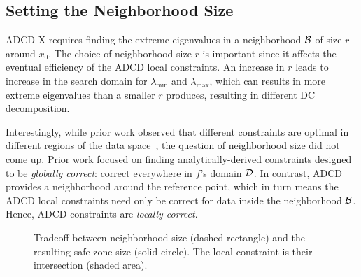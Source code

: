 \subsection{Setting the Neighborhood Size} 
\label{sub_sec:sub_domain_size}


ADCD-X requires finding the extreme eigenvalues in a neighborhood $\mathcal{B}$ of size $r$ around $x_0$.
The choice of neighborhood size $r$ is important since it affects the eventual efficiency of the ADCD local constraints.
An increase in $r$ leads to increase in the search domain for $\lambda_{\min}$ and $\lambda_{\max}$, which can results in more extreme eigenvalues than a smaller $r$ produces, resulting in different DC decomposition.

Interestingly, while prior work observed that different constraints are optimal in different regions of the data space~\cite{lazerson:lightweight_monitoring}, the question of neighborhood size did not come up.
Prior work focused on 
finding analytically-derived constraints designed to be \emph{globally correct}: correct everywhere in $f$'s domain $\mathcal{D}$.
In contrast, ADCD provides a neighborhood around the reference point, which in turn means the ADCD local constraints need only be correct for data inside the neighborhood $\mathcal{B}$.
Hence, ADCD constraints are \emph{locally correct}.

\begin{figure}
	\centering
	\qquad
	\caption{
		Tradeoff between neighborhood size (dashed rectangle) and the resulting safe zone size (solid circle). 
		The local constraint is their intersection (shaded area).
	}
	\label{fig:domain_sz_tradeoff}
\end{figure}

